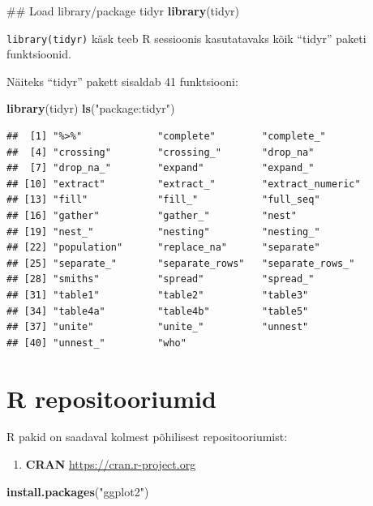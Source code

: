 \documentclass[]{book}
\newenvironment{Shaded}{\begin{snugshade}}{\end{snugshade}}
\newcommand{\KeywordTok}[1]{\textcolor[rgb]{0.13,0.29,0.53}{\textbf{#1}}}
\newcommand{\StringTok}[1]{\textcolor[rgb]{0.31,0.60,0.02}{#1}}
\newcommand{\NormalTok}[1]{#1}
\providecommand{\tightlist}{%
  \setlength{\itemsep}{0pt}\setlength{\parskip}{0pt}}
\begin{document}
\begin{Shaded}
\begin{Highlighting}[]
\NormalTok{## Load library/package tidyr}
\KeywordTok{library}\NormalTok{(tidyr)}
\end{Highlighting}
\end{Shaded}

\texttt{library(tidyr)} käsk teeb R sessioonis kasutatavaks kõik
``tidyr'' paketi funktsioonid.

Näiteks ``tidyr'' pakett sisaldab 41 funktsiooni:

\begin{Shaded}
\begin{Highlighting}[]
\KeywordTok{library}\NormalTok{(tidyr)}
\KeywordTok{ls}\NormalTok{(}\StringTok{"package:tidyr"}\NormalTok{)}
\end{Highlighting}
\end{Shaded}

\begin{verbatim}
##  [1] "%>%"             "complete"        "complete_"      
##  [4] "crossing"        "crossing_"       "drop_na"        
##  [7] "drop_na_"        "expand"          "expand_"        
## [10] "extract"         "extract_"        "extract_numeric"
## [13] "fill"            "fill_"           "full_seq"       
## [16] "gather"          "gather_"         "nest"           
## [19] "nest_"           "nesting"         "nesting_"       
## [22] "population"      "replace_na"      "separate"       
## [25] "separate_"       "separate_rows"   "separate_rows_" 
## [28] "smiths"          "spread"          "spread_"        
## [31] "table1"          "table2"          "table3"         
## [34] "table4a"         "table4b"         "table5"         
## [37] "unite"           "unite_"          "unnest"         
## [40] "unnest_"         "who"
\end{verbatim}

\section{R repositooriumid}\label{r-repositooriumid}

R pakid on saadaval kolmest põhilisest repositooriumist:

\begin{enumerate}
\def\labelenumi{\arabic{enumi}.}
\tightlist
\item
  \textbf{CRAN} \url{https://cran.r-project.org}
\end{enumerate}

\begin{Shaded}
\begin{Highlighting}[]
\KeywordTok{install.packages}\NormalTok{(}\StringTok{"ggplot2"}\NormalTok{)}
\end{Highlighting}
\end{Shaded}
\end{document}
